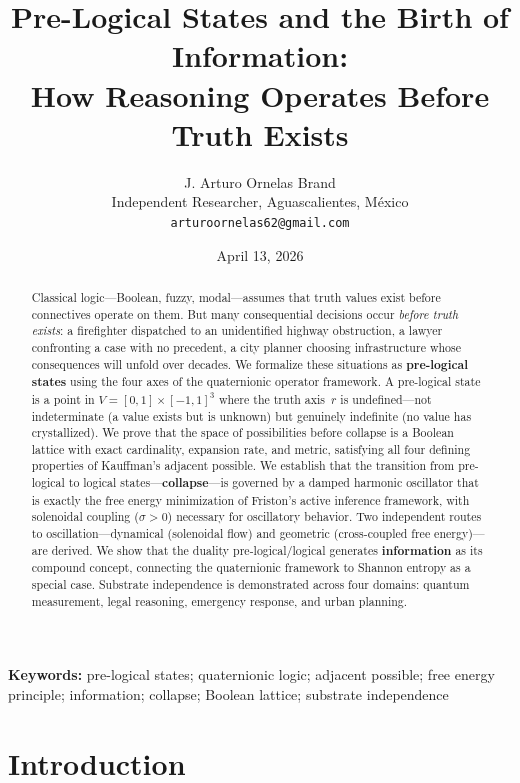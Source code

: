 \documentclass[11pt,a4paper]{article}
\title{Pre-Logical States and the Birth of Information:\\
How Reasoning Operates Before Truth Exists}
\author{J. Arturo Ornelas Brand\\
\small Independent Researcher, Aguascalientes, M\'exico\\
\small \texttt{arturoornelas62@gmail.com}}
\date{April 13, 2026}
\begin{document}
\maketitle

\begin{abstract}
Classical logic---Boolean, fuzzy, modal---assumes that truth values exist
before connectives operate on them. But many consequential decisions
occur \emph{before truth exists}: a firefighter dispatched to an
unidentified highway obstruction, a lawyer confronting a case with no
precedent, a city planner choosing infrastructure whose consequences
will unfold over decades. We formalize these situations as
\textbf{pre-logical states} using the four axes of the quaternionic
operator framework. A pre-logical state is a point in
$V = [0,1] \times [-1,1]^3$ where the truth axis~$r$ is undefined---not
indeterminate (a value exists but is unknown) but genuinely indefinite
(no value has crystallized). We prove that the space of possibilities
before collapse is a Boolean lattice with exact cardinality, expansion
rate, and metric, satisfying all four defining properties of Kauffman's
adjacent possible. We establish that the transition from pre-logical to
logical states---\textbf{collapse}---is governed by a damped harmonic
oscillator that is exactly the free energy minimization of Friston's
active inference framework, with solenoidal coupling ($\sigma > 0$)
necessary for oscillatory behavior. Two independent routes to
oscillation---dynamical (solenoidal flow) and geometric (cross-coupled
free energy)---are derived. We show that the duality pre-logical/\allowbreak logical
generates \textbf{information} as its compound concept, connecting the
quaternionic framework to Shannon entropy as a special case.
Substrate independence is demonstrated across four domains: quantum
measurement, legal reasoning, emergency response, and urban planning.
\end{abstract}

\noindent\textbf{Keywords:} pre-logical states; quaternionic logic;
adjacent possible; free energy principle; information; collapse;
Boolean lattice; substrate independence

\section{Introduction}
\label{sec:intro}
\end{document}
